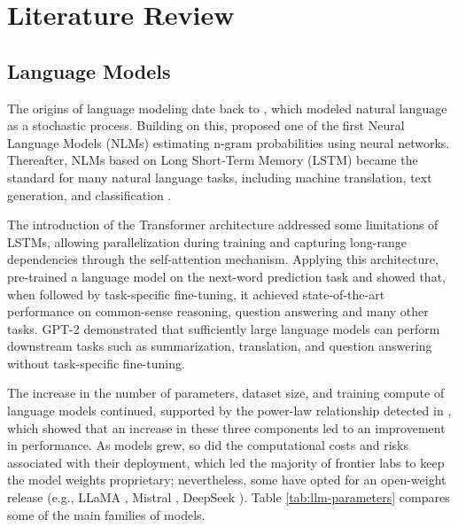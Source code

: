     

\chapter{Literature Review} \label{chap:litreview}
\section{Language Models} \label{sec:llm-agents}

The origins of language modeling date back to \textcite{6773024}, which modeled natural language as a stochastic process. Building on this, \textcite{bengio_neural_2003} proposed one of the first Neural Language Models (NLMs) estimating n-gram probabilities using neural networks. Thereafter, NLMs based on Long Short-Term Memory (LSTM) became the standard for many natural language tasks, including machine translation, text generation, and classification \parencite{minaee2025largelanguagemodelssurvey, sutskever2014sequencesequencelearningneural}.

The introduction of the Transformer architecture \parencite{vaswani2023attentionneed} addressed some limitations of LSTMs, allowing parallelization during training and capturing long-range dependencies through the self-attention mechanism. Applying this architecture, \textcite{Radford2018ImprovingLU} pre-trained a language model on the next-word prediction task and showed that, when followed by task-specific fine-tuning, it achieved state-of-the-art performance on common-sense reasoning, question answering and many other tasks. GPT-2 \parencite{Radford2019LanguageMA} demonstrated that sufficiently large language models can perform downstream tasks such as summarization, translation, and question answering without task-specific fine-tuning.

The increase in the number of parameters, dataset size, and training compute of language models continued, supported by the power-law relationship detected in \textcite{kaplan2020scalinglawsneurallanguage}, which showed that an increase in these three components led to an improvement in performance. As models grew, so did the computational costs and risks associated with their deployment, which led the majority of frontier labs to keep the model weights proprietary; nevertheless, some have opted for an open-weight release (e.g., LLaMA \cite{grattafiori2024llama3herdmodels}, Mistral \cite{jiang2023mistral7b}, DeepSeek \cite{deepseekai2025deepseekv32pushingfrontieropen}). Table \ref{tab:llm-parameters} compares some of the main families of models.

